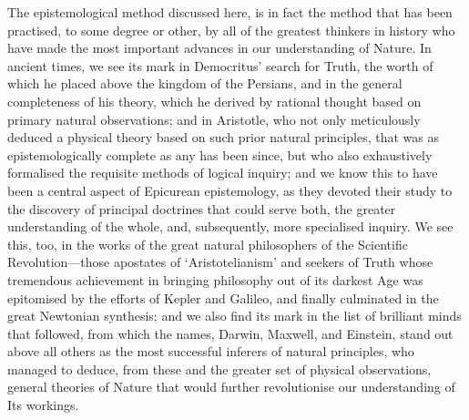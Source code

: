 The epistemological method discussed here, is in fact the method that has been practised, to some degree or other, by all of the greatest thinkers in history who have made the most important advances in our understanding of Nature. In ancient times, we see its mark in Democritus' search for Truth, the worth of which he placed above the kingdom of the Persians, and in the general completeness of his theory, which he derived by rational thought based on primary natural observations; and in Aristotle, who not only meticulously deduced a physical theory based on such prior natural principles, that was as epistemologically complete as any has been since, but who also exhaustively formalised the requisite methods of logical inquiry; and we know this to have been a central aspect of Epicurean epistemology, as they devoted their study to the discovery of principal doctrines that could serve both, the greater understanding of the whole, and, subsequently, more specialised inquiry. We see this, too, in the works of the great natural philosophers of the Scientific Revolution---those apostates of `Aristotelianism' and seekers of Truth whose tremendous achievement in bringing philosophy out of its darkest Age was epitomised by the efforts of Kepler and Galileo, and finally culminated in the great Newtonian synthesis; and we also find its mark in the list of brilliant minds that followed, from which the names, Darwin, Maxwell, and Einstein, stand out above all others as the most successful inferers of natural principles, who managed to deduce, from these and the greater set of physical observations, general theories of Nature that would further revolutionise our understanding of Its workings.

